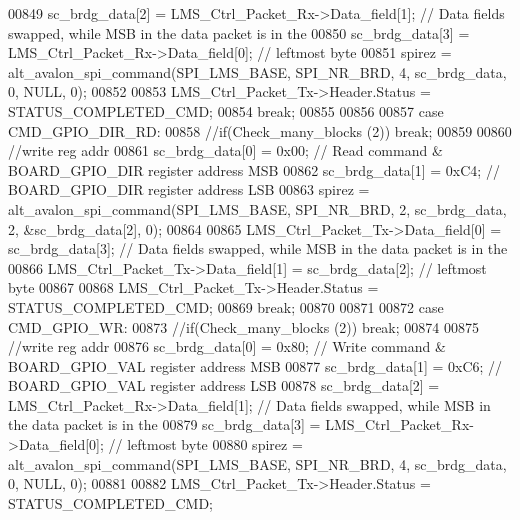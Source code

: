 \begin{DoxyCode}
00849                     sc_brdg_data[2] = LMS\_Ctrl\_Packet\_Rx->Data_field[1];    \textcolor{comment}{// Data fields swapped, while
       MSB in the data packet is in the}
00850                     sc_brdg_data[3] = LMS\_Ctrl\_Packet\_Rx->Data_field[0];    \textcolor{comment}{// leftmost byte}
00851                     spirez = alt_avalon_spi_command(SPI_LMS_BASE, SPI_NR_BRD, 4, 
      sc_brdg_data, 0, NULL, 0);
00852 
00853                     LMS\_Ctrl\_Packet\_Tx->Header.Status = STATUS_COMPLETED_CMD;
00854                 \textcolor{keywordflow}{break};
00855 
00856 
00857                 \textcolor{keywordflow}{case} CMD_GPIO_DIR_RD:
00858                     \textcolor{comment}{//if(Check\_many\_blocks (2)) break;}
00859 
00860                     \textcolor{comment}{//write reg addr}
00861                     sc_brdg_data[0] = 0x00;     \textcolor{comment}{// Read command & BOARD\_GPIO\_DIR register address MSB}
00862                     sc_brdg_data[1] = 0xC4;     \textcolor{comment}{// BOARD\_GPIO\_DIR register address LSB}
00863                     spirez = alt_avalon_spi_command(SPI_LMS_BASE, SPI_NR_BRD, 2, 
      sc_brdg_data, 2, &sc_brdg_data[2], 0);
00864 
00865                     LMS\_Ctrl\_Packet\_Tx->Data_field[0] = sc_brdg_data[3];    \textcolor{comment}{// Data fields swapped, while
       MSB in the data packet is in the}
00866                     LMS\_Ctrl\_Packet\_Tx->Data_field[1] = sc_brdg_data[2];    \textcolor{comment}{// leftmost byte}
00867 
00868                     LMS\_Ctrl\_Packet\_Tx->Header.Status = STATUS_COMPLETED_CMD;
00869                 \textcolor{keywordflow}{break};
00870 
00871 
00872                 \textcolor{keywordflow}{case} CMD_GPIO_WR:
00873                     \textcolor{comment}{//if(Check\_many\_blocks (2)) break;}
00874 
00875                     \textcolor{comment}{//write reg addr}
00876                     sc_brdg_data[0] = 0x80;     \textcolor{comment}{// Write command & BOARD\_GPIO\_VAL register address MSB}
00877                     sc_brdg_data[1] = 0xC6;     \textcolor{comment}{// BOARD\_GPIO\_VAL register address LSB}
00878                     sc_brdg_data[2] = LMS\_Ctrl\_Packet\_Rx->Data_field[1];    \textcolor{comment}{// Data fields swapped, while
       MSB in the data packet is in the}
00879                     sc_brdg_data[3] = LMS\_Ctrl\_Packet\_Rx->Data_field[0];    \textcolor{comment}{// leftmost byte}
00880                     spirez = alt_avalon_spi_command(SPI_LMS_BASE, SPI_NR_BRD, 4, 
      sc_brdg_data, 0, NULL, 0);
00881 
00882                     LMS\_Ctrl\_Packet\_Tx->Header.Status = STATUS_COMPLETED_CMD;

\end{DoxyCode}
